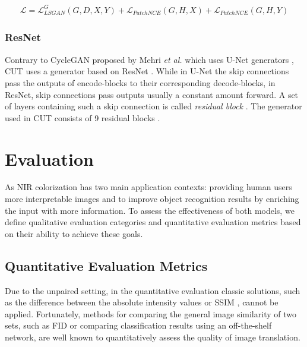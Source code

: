 \documentclass[a4paper,11pt, DIV=12]{scrartcl}
\begin{document}
\begin{equation}
   \label{eqn:cut_total_loss}
   \begin{aligned}
      \mathcal{L} = \mathcal{L}_{LSGAN}^G(G, D, X, Y) + \mathcal{L}_{PatchNCE}(G,H,X) + \mathcal{L}_{PatchNCE}(G,H,Y)
   \end{aligned}
\end{equation}

\subsubsection*{ResNet}
Contrary to CycleGAN proposed by Mehri \textit{et al.} which uses U-Net \cite{unet} generators \cite{mehri2019colorizing}, CUT uses a generator based on ResNet \cite{cut,resnet}.
While in U-Net the skip connections pass the outputs of encode-blocks to their corresponding decode-blocks, in ResNet, skip connections pass outputs usually a constant amount forward.
A set of layers containing such a skip connection is called \textit{residual block} \cite{resnet}.
The generator used in CUT consists of 9 residual blocks \cite{cut}.

\section{Evaluation}
As NIR colorization has two main application contexts: providing human users more interpretable images and to improve object recognition results by enriching the input with more information.
To assess the effectiveness of both models, we define qualitative evaluation categories and quantitative evaluation metrics based on their ability to achieve these goals.

\subsection{Quantitative Evaluation Metrics}
Due to the unpaired setting, in the quantitative evaluation classic solutions, such as the difference between the absolute intensity values or SSIM \cite{ssim}, cannot be applied. Fortunately, methods for comparing the general image similarity of two sets, such as FID \cite{ttur} or
comparing classification results using an off-the-shelf network, are well known to quantitatively assess the quality of image translation.
\end{document}
